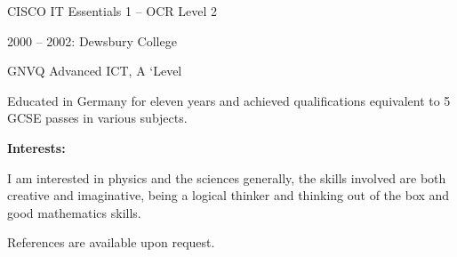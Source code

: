 \documentclass[12pt,a4paper]{book}
\begin{document}
\begin{flushleft}
    CISCO IT Essentials 1 -- OCR Level 2

  2000 -- 2002: Dewsbury College

    GNVQ Advanced ICT, A `Level

Educated in Germany for eleven years and achieved qualifications
equivalent to 5 GCSE passes in various subjects.

\textbf {Interests:}

I am interested in physics and the sciences generally, the skills
involved are both creative and imaginative, being a logical thinker and
thinking out of the box and good mathematics skills.

References are available upon request.
\end{flushleft}
\end{document}
